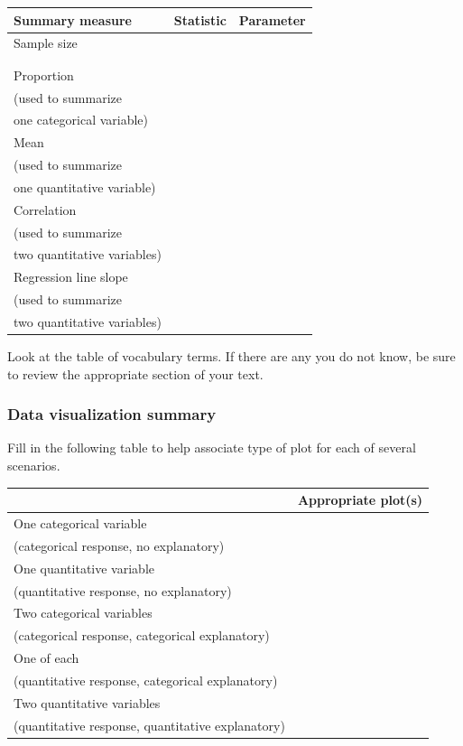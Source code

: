 \documentclass[
]{report}
\begin{document}
\begin{center}
\begin{tabular}{|l|p{2in}|p{2in}|}\hline
Summary measure & Statistic & Parameter \\ \hline
Sample size & & \\ 
& & \\ 
& & \\ \hline
Proportion & & \\ 
(used to summarize & & \\ 
one categorical variable) & & \\ \hline
Mean & & \\ 
(used to summarize & & \\ 
one quantitative variable)& & \\ \hline
Correlation & & \\ 
(used to summarize & & \\ 
two quantitative variables)& & \\ \hline
Regression line slope & & \\ 
(used to summarize & & \\ 
two quantitative variables)& & \\ \hline
\end{tabular}
\end{center}

Look at the table of vocabulary terms. If there are any you do not know, be sure to review the appropriate section of your text.

\hypertarget{data-visualization-summary}{%
\subsubsection*{Data visualization summary}\label{data-visualization-summary}}

Fill in the following table to help associate type of plot for each of several scenarios.

\begin{center}
\begin{tabular}{|l|p{3in}|} \hline
 & Appropriate plot(s) \\ \hline
One categorical variable & \\
(categorical response, no explanatory) & \\ \hline
One quantitative variable  & \\
(quantitative response, no explanatory) & \\ \hline
Two categorical variables  & \\
(categorical response, categorical explanatory) & \\ \hline
One of each  & \\
(quantitative response, categorical explanatory) & \\ \hline
Two quantitative variables  & \\
(quantitative response, quantitative explanatory) & \\ \hline
\end{tabular}
\end{center}
\end{document}
